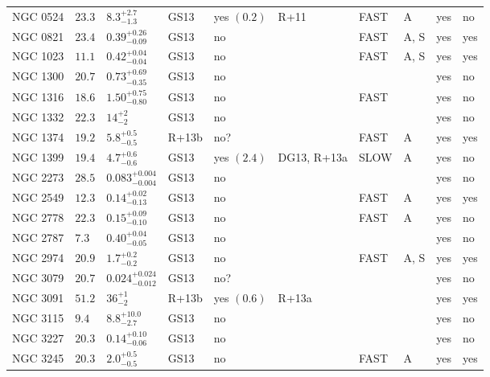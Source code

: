 \begin{table*}
\begin{center}
\begin{tabular}{llllllllll}
NGC 0524  &  $23.3$  &  $8.3_{-1.3}^{+2.7}$   &  GS13  &  yes  $(0.2)$  &  R+11  &  FAST   &  A  &  yes  &  no  \\ 
NGC 0821  &  $23.4$  &  $0.39_{-0.09}^{+0.26}$   &  GS13  &  no   &     &  FAST   &  A, S  &  yes  &  yes  \\ 
NGC 1023  &  $11.1$  &  $0.42_{-0.04}^{+0.04}$   &  GS13  &  no   &     &  FAST   &  A, S  &  yes  &  yes  \\ 
NGC 1300  &  $20.7$  &  $0.73_{-0.35}^{+0.69}$   &  GS13  &  no   &     &      &     &  yes  &  no  \\ 
NGC 1316  &  $18.6$  &  $1.50_{-0.80}^{+0.75}$   &  GS13  &  no   &     &  FAST   &     &  yes  &  no  \\ 
NGC 1332  &  $22.3$  &  $14_{-2}^{+2}$   &  GS13  &  no   &     &      &     &  yes  &  no  \\ 
NGC 1374  &  $19.2$  &  $5.8_{-0.5}^{+0.5}$   &  R+13b  &  no?  &     &  FAST   &  A  &  yes  &  yes  \\ 
NGC 1399  &  $19.4$  &  $4.7_{-0.6}^{+0.6}$   &  GS13  &  yes  $(2.4)$  &  DG13, R+13a  &   SLOW  &  A  &  yes  &  no  \\ 
NGC 2273  &  $28.5$  &  $0.083_{-0.004}^{+0.004}$   &  GS13  &  no   &     &      &     &  yes  &  no  \\ 
NGC 2549  &  $12.3$  &  $0.14_{-0.13}^{+0.02}$   &  GS13  &  no   &     &  FAST   &  A  &  yes  &  yes  \\ 
NGC 2778  &  $22.3$  &  $0.15_{-0.10}^{+0.09}$   &  GS13  &  no   &     &  FAST   &  A  &  yes  &  no  \\ 
NGC 2787  &  $7.3$  &  $0.40_{-0.05}^{+0.04}$   &  GS13  &  no   &     &      &     &  yes  &  no  \\ 
NGC 2974  &  $20.9$  &  $1.7_{-0.2}^{+0.2}$   &  GS13  &  no   &     &  FAST   &  A, S  &  yes  &  yes  \\ 
NGC 3079  &  $20.7$  &  $0.024_{-0.012}^{+0.024}$   &  GS13  &  no?  &     &      &     &  yes  &  no  \\ 
NGC 3091  &  $51.2$  &  $36_{-2}^{+1}$   &  R+13b  &  yes  $(0.6)$  &  R+13a  &      &     &  yes  &  yes  \\ 
NGC 3115  &  $9.4$  &  $8.8_{-2.7}^{+10.0}$   &  GS13  &  no   &     &      &     &  yes  &  no  \\ 
NGC 3227  &  $20.3$  &  $0.14_{-0.06}^{+0.10}$   &  GS13  &  no   &     &      &     &  yes  &  no  \\ 
NGC 3245  &  $20.3$  &  $2.0_{-0.5}^{+0.5}$   &  GS13  &  no   &     &  FAST   &  A  &  yes  &  yes  \\ 

\end{tabular}
\end{center}
\end{table*}
